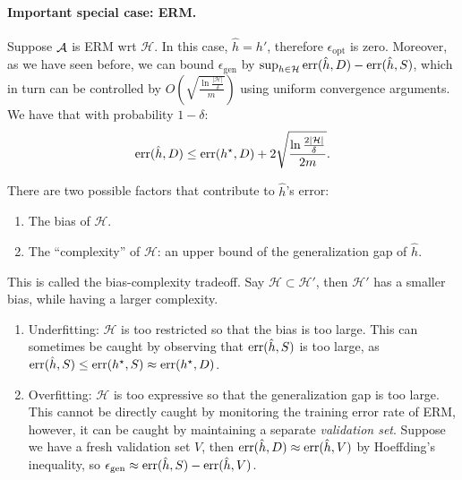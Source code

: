 \documentclass{article}
\DeclareMathOperator*{\err}{{\rm err}}
\DeclareMathOperator*{\Acal}{{\cal A}}
\newcommand{\Hcal}{\mathcal{H}}
\begin{document}

\paragraph{Important special case: ERM.} Suppose $\Acal$ is ERM wrt $\Hcal$. In this case, $\hat{h} = h'$, therefore $\epsilon_{\text{opt}}$ is zero. Moreover, as we have seen before, we can bound $\epsilon_{\text{gen}}$ by $\sup_{h \in \Hcal} \err(\hat{h}, D) - \err(\hat{h}, S)$, which in turn can be controlled by
$O(\sqrt{\frac{\ln\frac{|\Hcal|}{\delta}}{m}})$ using uniform convergence arguments. We have that with probability $1-\delta$:
\[ \err(\hat{h}, D) \leq \err(h^
\star, D) + 2\sqrt{\frac{\ln\frac{2|\Hcal|}{\delta}}{2m}}. \]

There are two possible factors that contribute to $\hat{h}$'s error:
\begin{enumerate}
\item The bias of $\Hcal$.
\item The ``complexity'' of $\Hcal$: an upper bound of the generalization gap of $\hat{h}$.
\end{enumerate}
This is called the bias-complexity tradeoff. Say $\Hcal \subset \Hcal'$, then $\Hcal'$ has a smaller bias, while having a larger complexity.

\begin{enumerate}
\item Underfitting: $\Hcal$ is too restricted so that the bias is too large. This can sometimes be caught by observing that $\err(\hat{h}, S)$ is too large, as $\err(\hat{h}, S) \leq \err(h^\star, S) \approx \err(h^\star, D)$.
\item Overfitting: $\Hcal$ is too expressive so that the generalization gap is too large. This cannot be directly caught by monitoring the training error rate of ERM, however, it can be caught by maintaining a separate {\em validation set}. Suppose we have a fresh validation set $V$, then $\err(\hat{h}, D) \approx \err(\hat{h}, V)$ by Hoeffding's inequality, so $\epsilon_{\text{gen}} \approx \err(\hat{h}, S) - \err(\hat{h}, V)$.
\end{enumerate}
\end{document}
